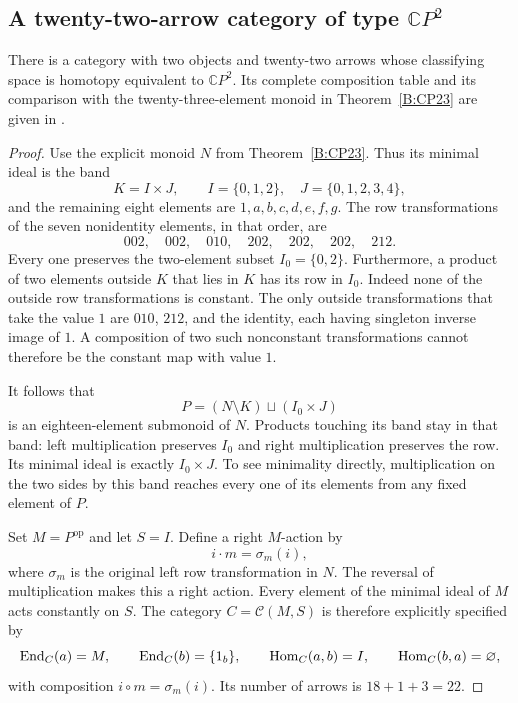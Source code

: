 \subsection{A twenty-two-arrow category of type $\mathbb CP^2$}

\begin{theorem}\label{C:CP2-upper22}
There is a category with two objects and twenty-two arrows whose
classifying space is homotopy equivalent to $\mathbb CP^2$.
Its complete composition table and its comparison with the
twenty-three-element monoid in Theorem~\ref{B:CP23} are given in
.
\end{theorem}
\begin{proof}
Use the explicit monoid $N$ from Theorem~\ref{B:CP23}.
Thus its minimal ideal is the band
\[
 K=I\times J,\qquad I=\{0,1,2\},\quad
 J=\{0,1,2,3,4\},
\]
and the remaining eight elements are $1,a,b,c,d,e,f,g$.
The row transformations of the seven nonidentity elements, in that
order, are
\[
 002,\quad002,\quad010,\quad202,\quad202,\quad202,\quad212.
\]
Every one preserves the two-element subset $I_0=\{0,2\}$.
Furthermore, a product of two elements outside $K$ that lies in
$K$ has its row in $I_0$.  Indeed none of the outside row
transformations is constant.  The only outside transformations
that take the value $1$ are $010$, $212$, and the identity, each
having singleton inverse image of $1$.  A composition of two
such nonconstant transformations cannot therefore be the constant
map with value $1$.

It follows that
\[
 P=(N\setminus K)\sqcup(I_0\times J)
\]
is an eighteen-element submonoid of $N$.  Products touching its
band stay in that band: left multiplication preserves $I_0$ and
right multiplication preserves the row.  Its minimal ideal is
exactly $I_0\times J$.  To see minimality directly, multiplication
on the two sides by this band reaches every one of its elements
from any fixed element of $P$.

Set $M=P^{\mathrm{op}}$ and let $S=I$.  Define a right $M$-action
by
\[
 i\cdot m=\sigma_m(i),
\]
where $\sigma_m$ is the original left row transformation in $N$.
The reversal of multiplication makes this a right action.
Every element of the minimal ideal of $M$ acts constantly on $S$.
The category $C=\mathcal C(M,S)$ is therefore explicitly specified
by
\[
 \operatorname{End}_C(a)=M,\qquad\operatorname{End}_C(b)=\{1_b\},\qquad
 \operatorname{Hom}_C(a,b)=I,\qquad\operatorname{Hom}_C(b,a)=\varnothing,
\]
with composition $i\circ m=\sigma_m(i)$.  Its number of arrows is
$18+1+3=22$.


\end{proof}
